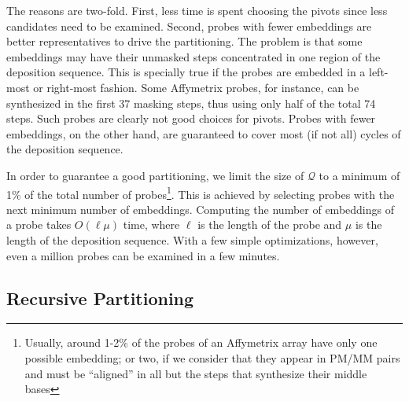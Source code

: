 \documentclass{llncs}
\begin{document}
The reasons are two-fold. First, less time is spent choosing the pivots
since less candidates need to be examined.
Second, probes with fewer embeddings are better representatives to drive
the partitioning. The problem is that some embeddings may have their unmasked steps
concentrated in one region of the deposition sequence. This is specially true if
the probes are embedded in a left-most or right-most fashion.
Some Affymetrix probes, for instance,
can be synthesized in the first 37 masking steps, thus
using only half of the total 74 steps. Such probes are clearly not good choices
for pivots. Probes with fewer embeddings, on the other hand,
are guaranteed to cover most (if not all) cycles of the deposition sequence.

In order to guarantee a good partitioning,
we limit the size of $\mathcal{Q}$ to a minimum of 1\% of the total
number of probes\footnote{Usually, around 1-2\% of the probes of an Affymetrix array
have only one possible embedding; or two, if we consider that they appear in PM/MM
pairs and must be ``aligned'' in all but the steps that synthesize their middle
bases}. This is achieved by selecting probes with the next minimum
number of embeddings.
Computing the number of embeddings of a probe takes $O(\ell \mu)$ time, where
$\ell$ is the length of the probe and $\mu$ is the length of the deposition sequence.
With a few simple optimizations, however, even a million probes can be examined in
a few minutes.

\subsection{Recursive Partitioning}
\end{document}
